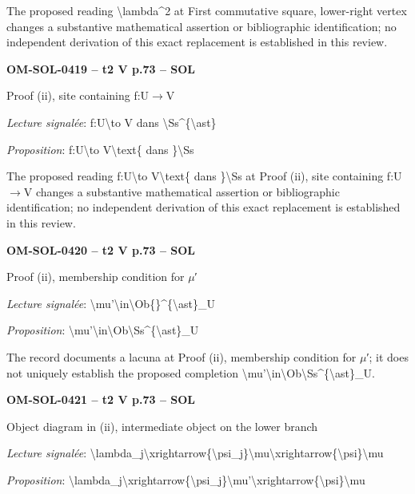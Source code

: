 The proposed reading \textbackslash{}lambda\textasciicircum{}2 at First commutative square, lower-right vertex changes a substantive mathematical assertion or bibliographic identification; no independent derivation of this exact replacement is established in this review.\par
\par\noindent\textbf{OM-SOL-0419 -- t2 V p.73 -- SOL}\par
Proof (ii), site containing f:U\ensuremath{\to}V\par
\emph{Lecture signalée}: f:U\textbackslash{}to V dans \textbackslash{}Ss\textasciicircum{}\{\textbackslash{}ast\}\par
\emph{Proposition}: f:U\textbackslash{}to V\textbackslash{}text\{ dans \}\textbackslash{}Ss\par
The proposed reading f:U\textbackslash{}to V\textbackslash{}text\{ dans \}\textbackslash{}Ss at Proof (ii), site containing f:U\ensuremath{\to}V changes a substantive mathematical assertion or bibliographic identification; no independent derivation of this exact replacement is established in this review.\par
\par\noindent\textbf{OM-SOL-0420 -- t2 V p.73 -- SOL}\par
Proof (ii), membership condition for \ensuremath{\mu}′\par
\emph{Lecture signalée}: \textbackslash{}mu'\textbackslash{}in\textbackslash{}Ob\{\}\textasciicircum{}\{\textbackslash{}ast\}\_U\par
\emph{Proposition}: \textbackslash{}mu'\textbackslash{}in\textbackslash{}Ob\textbackslash{}Ss\textasciicircum{}\{\textbackslash{}ast\}\_U\par
The record documents a lacuna at Proof (ii), membership condition for \ensuremath{\mu}′; it does not uniquely establish the proposed completion \textbackslash{}mu'\textbackslash{}in\textbackslash{}Ob\textbackslash{}Ss\textasciicircum{}\{\textbackslash{}ast\}\_U.\par
\par\noindent\textbf{OM-SOL-0421 -- t2 V p.73 -- SOL}\par
Object diagram in (ii), intermediate object on the lower branch\par
\emph{Lecture signalée}: \textbackslash{}lambda\_j\textbackslash{}xrightarrow\{\textbackslash{}psi\_j\}\textbackslash{}mu\textbackslash{}xrightarrow\{\textbackslash{}psi\}\textbackslash{}mu\par
\emph{Proposition}: \textbackslash{}lambda\_j\textbackslash{}xrightarrow\{\textbackslash{}psi\_j\}\textbackslash{}mu'\textbackslash{}xrightarrow\{\textbackslash{}psi\}\textbackslash{}mu\par
